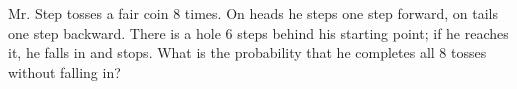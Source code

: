 Mr. Step tosses a fair coin $8$ times. On heads he steps one step forward, on tails one step backward. There is a hole $6$ steps behind his starting point; if he reaches it, he falls in and stops. What is the probability that he completes all $8$ tosses without falling in?
